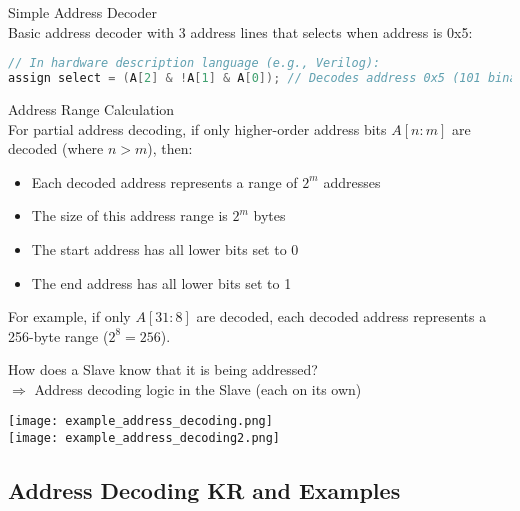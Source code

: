 \begin{examplecode}{Simple Address Decoder}\\
Basic address decoder with 3 address lines that selects when address is 0x5:
\begin{lstlisting}[language=C, style=basesmol]
// In hardware description language (e.g., Verilog):
assign select = (A[2] & !A[1] & A[0]); // Decodes address 0x5 (101 binary)
\end{lstlisting}
\end{examplecode}

\columnbreak

\begin{theorem}{Address Range Calculation}\\
For partial address decoding, if only higher-order address bits \(A[n:m]\) are decoded (where \(n > m\)), then:
\begin{itemize}
    \item Each decoded address represents a range of \(2^m\) addresses
    \item The size of this address range is \(2^m\) bytes
    \item The start address has all lower bits set to 0
    \item The end address has all lower bits set to 1
\end{itemize}
For example, if only \(A[31:8]\) are decoded, each decoded address represents a 256-byte range (\(2^8 = 256\)).
\end{theorem}

\begin{remark}
    How does a Slave know that it is being addressed?\\
    $\Rightarrow$ Address decoding logic in the Slave (each on its own)
\end{remark}



\begin{example}
    \texttt{[image: example\_address\_decoding.png]}\\
    \texttt{[image: example\_address\_decoding2.png]}
\end{example}

\columnbreak

\subsection{Address Decoding KR and Examples}



